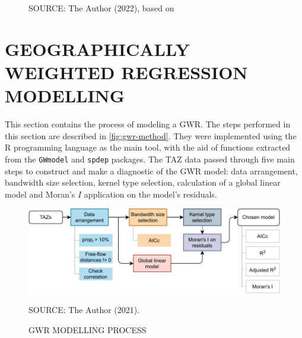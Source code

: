 \begin{figure}[!htbp]
\begin{subfigure}{0.5\textwidth}
    \end{subfigure}
    \label{fig:bsd_avi}
    \par SOURCE: The Author (2022), based on \textcite{IPPUC2018b,IPPUC2020a, IBGE2010}
\end{figure}


\section{GEOGRAPHICALLY WEIGHTED REGRESSION MODELLING} \label{gwm}









This section contains the process of modeling a GWR. The steps performed in this section are described in \autoref{fig:gwr-method}. They were implemented using the R programming language as the main tool, with the aid of functions extracted from the \verb|GWmodel| \cite{Gollini2013} and \verb|spdep| \cite{Bivand2013} packages. The TAZ data passed through five main steps to construct and make a diagnostic of the GWR model: data arrangement, bandwidth size selection, kernel type selection, calculation of a global linear model and Moran's $I$ application on the model's residuals. 

\begin{figure}[!htbp]
    \centering\footnotesize
    \captionsetup{font=footnotesize}
    \caption{GWR MODELLING PROCESS}
    \includegraphics{fig/gwr-method.pdf}
    \label{fig:gwr-method}
    \par SOURCE: The Author (2021).
\end{figure}

